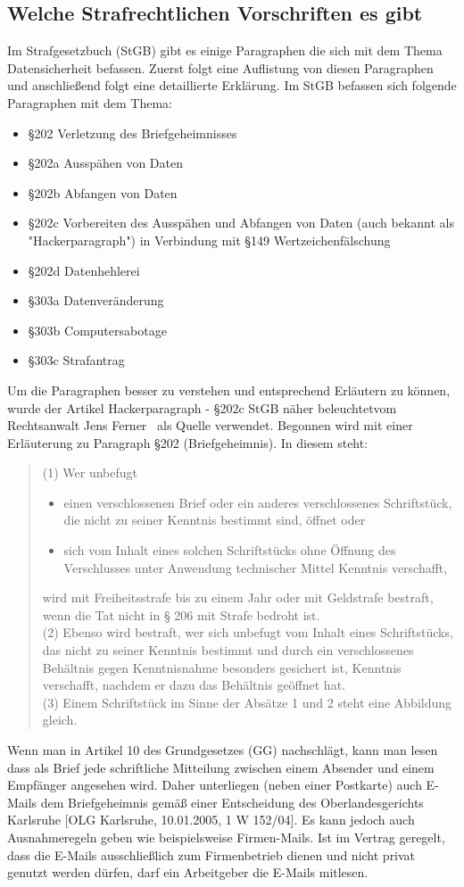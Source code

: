 \documentclass[10pt,a4paper]{article}
\begin{document}
\subsection*{Welche Strafrechtlichen Vorschriften es gibt}
Im Strafgesetzbuch (StGB) gibt es einige Paragraphen die sich mit dem Thema Datensicherheit befassen. Zuerst folgt eine Auflistung von diesen Paragraphen und anschließend folgt eine detaillierte Erklärung. Im StGB befassen sich folgende Paragraphen mit dem Thema:
\begin{itemize}
	\item §202 Verletzung des Briefgeheimnisses
	\item §202a Ausspähen von Daten
	\item §202b Abfangen von Daten
	\item §202c Vorbereiten des Ausspähen und Abfangen von Daten (auch bekannt als "Hackerparagraph") in Verbindung mit §149 Wertzeichenfälschung
	\item §202d Datenhehlerei
	\item §303a Datenveränderung
	\item §303b Computersabotage
	\item §303c Strafantrag 
\end{itemize}
Um die Paragraphen besser zu verstehen und entsprechend Erläutern zu können, wurde der Artikel \glqq Hackerparagraph - §202c StGB näher beleuchtet\grqq vom Rechtsanwalt Jens Ferner~\cite{InternetStrafrecht} als Quelle verwendet. Begonnen wird mit einer Erläuterung zu Paragraph §202 (Briefgeheimnis). In diesem steht:
\begin{quote}
(1) Wer unbefugt
\begin{itemize}
	\item[1.] einen verschlossenen Brief oder ein anderes verschlossenes Schriftstück, die nicht zu seiner Kenntnis bestimmt sind, öffnet oder
	\item[2.] sich vom Inhalt eines solchen Schriftstücks ohne Öffnung des Verschlusses unter Anwendung technischer Mittel Kenntnis verschafft,
\end{itemize}
wird mit Freiheitsstrafe bis zu einem Jahr oder mit Geldstrafe bestraft, wenn die Tat nicht in § 206 mit Strafe bedroht ist.\\
(2) Ebenso wird bestraft, wer sich unbefugt vom Inhalt eines Schriftstücks, das nicht zu seiner Kenntnis bestimmt und durch ein verschlossenes Behältnis gegen Kenntnisnahme besonders gesichert ist, Kenntnis verschafft, nachdem er dazu das Behältnis geöffnet hat.\\
(3) Einem Schriftstück im Sinne der Absätze 1 und 2 steht eine Abbildung gleich.
\end{quote}
Wenn man in Artikel 10 des Grundgesetzes (GG) nachschlägt, kann man lesen dass als Brief jede schriftliche Mitteilung zwischen einem Absender und einem Empfänger angesehen wird. Daher unterliegen (neben einer Postkarte) auch E-Mails  dem Briefgeheimnis gemäß einer Entscheidung des Oberlandesgerichts Karlsruhe [OLG Karlsruhe, 10.01.2005, 1 W 152/04]. Es kann jedoch auch Ausnahmeregeln geben wie beispielsweise Firmen-Mails. Ist im Vertrag geregelt, dass die E-Mails ausschließlich zum Firmenbetrieb dienen und nicht privat genutzt werden dürfen, darf ein Arbeitgeber die E-Mails mitlesen.
\end{document}
